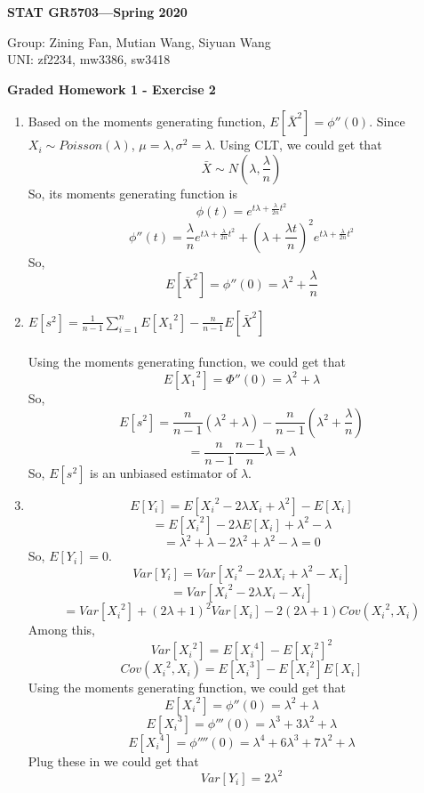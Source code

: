 \documentclass[11pt]{article}
\begin{document}
\begin{flushright}
{\bf STAT GR5703---Spring 2020}
\end{flushright}
\begin{flushleft}
Group: Zining Fan, Mutian Wang, Siyuan Wang\\
UNI: zf2234, mw3386, sw3418\\
\end{flushleft}

\bigskip
\centerline{\bf Graded Homework 1 - Exercise 2}

\bigskip
\begin{enumerate}
\item
Based on the moments generating function, $E[\bar{X}^2]=\phi''(0)$. Since $X_i\sim Poisson(\lambda)$, $\mu=\lambda, \sigma^2=\lambda$. Using CLT, we could get that 
    \[\bar{X}\sim N(\lambda,\frac{\lambda}{n})\]
    So, its moments generating function is 
    \[\phi(t)=e^{t\lambda+\frac{\lambda}{2n}t^2}\]
    \[\phi''(t)=\frac{\lambda}{n}e^{t\lambda+\frac{\lambda}{2n}t^2}+(\lambda+\frac{\lambda t}{n})^2e^{t\lambda+\frac{\lambda}{2n}t^2}\]
    So,
    \[E[\bar{X}^2]=\phi''(0)=\lambda^2+\frac{\lambda}{n}\]
\item
$E[s^2]=\frac{1}{n-1}\sum_{i=1}^{n}E[{X_1}^2]-\frac{n}{n-1}E[\bar{X}^2]$
    \\
    \\Using the moments generating function, we could get that 
    \[E[{X_1}^2]=\Phi''(0)=\lambda^2+\lambda\]
    So,
    \[E[s^2]=\frac{n}{n-1}(\lambda^2+\lambda)-\frac{n}{n-1}(\lambda^2+\frac{\lambda}{n})\]
    \[ =\frac{n}{n-1}\frac{n-1}{n}\lambda=\lambda\]
    So, $E[s^2]$ is an unbiased estimator of $\lambda$.
\item
\[E[Y_i]=E[{X_i}^2-2\lambda X_i+\lambda^2]-E[X_i]\]
    \[=E[{X_i}^2]-2\lambda E[X_i]+\lambda^2-\lambda\]
    \[=\lambda^2+\lambda-2\lambda^2+\lambda^2-\lambda=0\]
    So, $E[Y_i]=0$.
    \[Var[Y_i]=Var[{X_i}^2-2\lambda X_i+\lambda^2-X_i]\]
    \[=Var[{X_i}^2-2\lambda X_i-X_i]\]
    \[=Var[{X_i}^2]+(2\lambda+1)^2Var[X_i]-2(2\lambda+1)Cov({X_i}^2,X_i)\]
    Among this,
    \[Var[{X_i}^2]=E[{X_i}^4]-E[{X_i}^2]^2\]
    \[Cov({X_i}^2,X_i)=E[{X_i}^3]-E[{X_i}^2]E[X_i]\]
    Using the moments generating function, we could get that 
    \[E[{X_i}^2]=\phi''(0)=\lambda^2+\lambda\]
    \[E[{X_i}^3]=\phi'''(0)=\lambda^3+3\lambda^2+\lambda\]
    \[E[{X_i}^4]=\phi''''(0)=\lambda^4+6\lambda^3+7\lambda^2+\lambda\]
    Plug these in we could get that
    \[Var[Y_i]=2\lambda^2\]
    

\end{enumerate}
\end{document}
